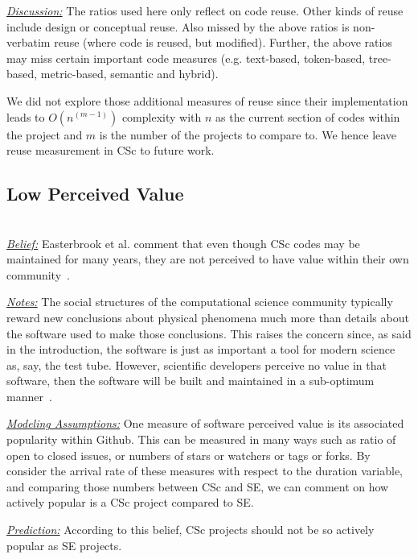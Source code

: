 \documentclass[conference,10pt]{IEEEtran}
\begin{document}
\noindent \textit{\underline{Discussion:}} 
The ratios used here only reflect on code reuse.
Other kinds of reuse include design or conceptual reuse. 
Also missed by the above ratios is non-verbatim reuse (where code is reused, but modified).
Further, the above ratios may miss certain important code measures
(e.g. text-based, token-based, tree-based, metric-based, semantic and hybrid).

We did not explore those additional measures of reuse since
their implementation leads to $O(n^{(m-1)})$ complexity with $n$ as the current section of codes within the project and $m$ is the number of the projects to compare to. We hence leave reuse measurement in CSc to  future work.

\subsection{Low Perceived Value} ~\\
\noindent \textit{\underline{Belief:}} 
Easterbrook et al. comment that even though CSc codes
may be maintained for many years,
they are not perceived to have value within their own community~\cite{faulk09_secs, segal07_enduser, easterbrook_cs, boyle09_lessons}.

\noindent \textit{\underline{Notes:}} The social structures of the computational science community
typically reward new conclusions about physical phenomena much more than
details about the software used
to make those conclusions. This raises the concern since, as said in the introduction, the software is just as important a tool for modern science as, say, the test tube. However, scientific developers perceive no value in that software, then the software will be built and maintained in a sub-optimum manner~\cite{sanders08_risk}. 

\noindent \textit{\underline{Modeling Assumptions:}} 
One measure of software perceived value is its associated popularity within Github. This can be measured in many ways such as ratio of open to closed issues, or
numbers of stars or watchers or tags or forks. By consider the arrival rate of these measures with respect to the duration variable, and comparing those numbers between CSc and SE, we can comment on how actively popular is a CSc project compared to SE.

\noindent \textit{\underline{Prediction:}} 
According to this belief, CSc projects should not be so actively popular as SE projects.
\end{document}
